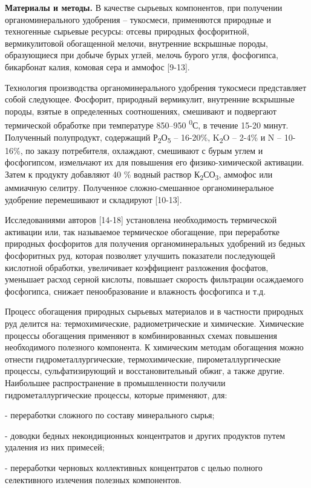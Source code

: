 \begin{multicols}{2}
{\bfseries Материалы и методы.} В качестве сырьевых компонентов, при
получении органоминерального удобрения -- тукосмеси, применяются
природные и техногенные сырьевые ресурсы: отсевы природных фосфоритной,
вермикулитовой обогащенной мелочи, внутренние вскрышные породы,
образующиеся при добыче бурых углей, мелочь бурого угля, фосфогипса,
бикарбонат калия, комовая сера и аммофос {[}9-13{]}.

Технология производства органоминерального удобрения тукосмеси
представляет собой следующее. Фосфорит, природный вермикулит, внутренние
вскрышные породы, взятые в определенных соотношениях, смешивают и
подвергают термической обработке при температуре 850--950
\textsuperscript{0}С, в течение 15-20 минут. Полученный полупродукт,
содержащий Р\textsubscript{2}О\textsubscript{5} -- 16-20\%,
K\textsubscript{2}O -- 2-4\% и N -- 10-16\%, по заказу потребителя,
охлаждают, смешивают с бурым углем и фосфогипсом, измельчают их для
повышения его физико-химической активации. Затем к продукту добавляют 40
\% водный раствор К\textsubscript{2}СО\textsubscript{3}, аммофос или
аммиачную селитру. Полученное сложно-смешанное органоминеральное
удобрение перемешивают и складируют {[}10-13{]}.

Исследованиями авторов {[}14-18{]} установлена необходимость термической
активации или, так называемое термическое обогащение, при переработке
природных фосфоритов для получения органоминеральных удобрений из бедных
фосфоритных руд, которая позволяет улучшить показатели последующей
кислотной обработки, увеличивает коэффициент разложения фосфатов,
уменьшает расход серной кислоты, повышает скорость фильтрации
осаждаемого фосфогипса, снижает пенообразование и влажность фосфогипса и
т.д.

Процесс обогащения природных сырьевых материалов и в частности природных
руд делится на: термохимические, радиометрические и химические.
Химические процессы обогащения применяют в комбинированных схемах
повышения необходимого полезного компонента. К химическим методам
обогащения можно отнести гидрометаллургические, термохимические,
пирометаллургические процессы, сульфатизирующий и восстановительный
обжиг, а также другие. Наибольшее распространение в промышленности
получили гидрометаллургические процессы, которые применяют, для:

- переработки сложного по составу минерального сырья;

- доводки бедных некондиционных концентратов и других продуктов путем
удаления из них примесей;

- переработки черновых коллективных концентратов с целью полного
селективного излечения полезных компонентов.


\end{multicols}
